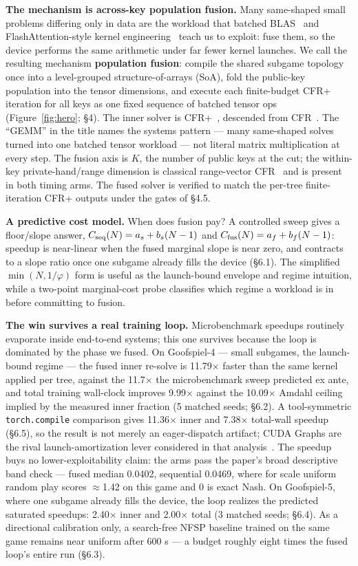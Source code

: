 \documentclass[11pt]{article}
\begin{document}
\textbf{The mechanism is across-key population fusion.} Many same-shaped small problems
differing only in data are the workload that batched BLAS~\citep{Abdelfattah2016,
Abdelfattah2021} and FlashAttention-style kernel engineering~\citep{Dao2022} teach us
to exploit: fuse them, so the device performs the same arithmetic under far fewer kernel
launches. We call the resulting mechanism \textbf{population fusion}: compile the shared
subgame topology once into a level-grouped structure-of-arrays (SoA), fold the public-key
population into the tensor dimensions, and execute each finite-budget CFR+ iteration for
all keys as one fixed sequence of batched tensor ops (Figure~\ref{fig:hero}; \S4). The
inner solver is CFR+~\citep{Tammelin2014,Tammelin2015,Bowling2015}, descended from
CFR~\citep{Zinkevich2007}. The ``GEMM'' in the title names the systems pattern --- many
same-shaped solves turned into one batched tensor workload --- not literal matrix
multiplication at every step. The fusion axis is $K$, the number of public keys at the
cut; the within-key private-hand/range dimension is classical range-vector
CFR~\citep{Johanson2011,Johanson2012} and is present in both timing arms. The fused
solver is verified to match the per-tree finite-iteration CFR+ outputs under the gates
of \S4.5.

\textbf{A predictive cost model.} When does fusion pay? A controlled sweep gives a
floor/slope answer,
$C_{\rm seq}(N)=a_s+b_s(N-1)$ and
$C_{\rm fus}(N)=a_f+b_f(N-1)$: speedup is near-linear when the fused marginal slope is
near zero, and contracts to a slope ratio once one subgame already fills the device
(\S6.1). The simplified $\min(N,1/\varphi)$ form is useful as the launch-bound envelope
and regime intuition, while a two-point marginal-cost probe classifies which
regime a workload is in before committing to fusion.

\textbf{The win survives a real training loop.} Microbenchmark speedups routinely
evaporate inside end-to-end systems; this one survives because the loop is dominated by
the phase we fused. On Goofspiel-4 --- small subgames, the launch-bound regime --- the
fused inner re-solve is 11.79$\times$ faster than the same kernel applied per tree,
against the 11.7$\times$ the microbenchmark sweep predicted ex ante, and total training
wall-clock improves 9.99$\times$ against the 10.09$\times$ Amdahl ceiling implied by the
measured inner fraction (5 matched seeds; \S6.2). A tool-symmetric
\texttt{torch.compile} comparison gives 11.36$\times$ inner and 7.38$\times$ total-wall
speedup (\S6.5), so the result is not merely an eager-dispatch artifact; CUDA Graphs are
the rival launch-amortization lever considered in that analysis~\citep{CUDAGraphs}. The
speedup buys no lower-exploitability claim: the arms pass the paper's broad descriptive
band check --- fused median 0.0402, sequential 0.0469, where for scale uniform random
play scores $\approx$1.42 on this game and 0 is exact Nash. On Goofspiel-5, where one
subgame already fills the device, the loop realizes the predicted saturated speedups:
2.40$\times$ inner and 2.00$\times$ total (3 matched seeds; \S6.4). As a directional
calibration only, a search-free NFSP baseline trained on the same game remains near
uniform after 600 s --- a budget roughly eight times the fused loop's entire run
(\S6.3).
\end{document}
